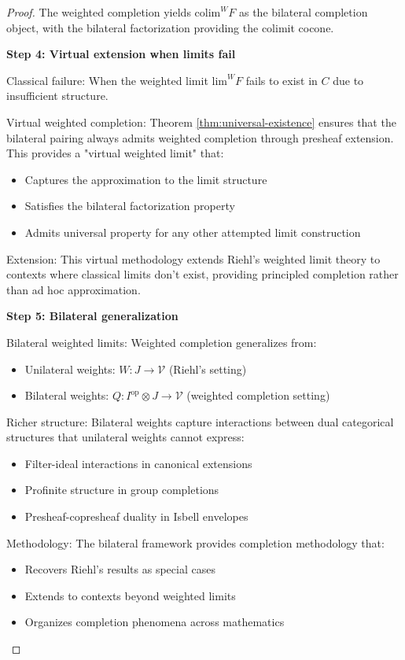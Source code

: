 \documentclass[11pt]{article}
\theoremstyle{plain}
\theoremstyle{definition}
\theoremstyle{remark}
\newcommand{\V}{\mathcal{V}}
\newcommand{\op}{\mathrm{op}}
\newcommand{\colim}{\mathrm{colim}}
\renewcommand{\lim}{\mathrm{lim}}
\begin{document}
\begin{proof}
The weighted completion yields $\colim^W F$ as the bilateral completion object, with the bilateral factorization providing the colimit cocone.

\textbf{Step 4: Virtual extension when limits fail}

Classical failure: When the weighted limit $\lim^W F$ fails to exist in $C$ due to insufficient structure.

Virtual weighted completion: Theorem \ref{thm:universal-existence} ensures that the bilateral pairing always admits weighted completion through presheaf extension. This provides a "virtual weighted limit" that:
\begin{itemize}
\item Captures the approximation to the limit structure
\item Satisfies the bilateral factorization property
\item Admits universal property for any other attempted limit construction
\end{itemize}

Extension: This virtual methodology extends Riehl's weighted limit theory to contexts where classical limits don't exist, providing principled completion rather than ad hoc approximation.

\textbf{Step 5: Bilateral generalization}

Bilateral weighted limits: Weighted completion generalizes from:
\begin{itemize}
\item Unilateral weights: $W : J \to \V$ (Riehl's setting)
\item Bilateral weights: $Q : I^{\op} \otimes J \to \V$ (weighted completion setting)
\end{itemize}

Richer structure: Bilateral weights capture interactions between dual categorical structures that unilateral weights cannot express:
\begin{itemize}
\item Filter-ideal interactions in canonical extensions
\item Profinite structure in group completions  
\item Presheaf-copresheaf duality in Isbell envelopes
\end{itemize}

Methodology: The bilateral framework provides completion methodology that:
\begin{itemize}
\item Recovers Riehl's results as special cases
\item Extends to contexts beyond weighted limits
\item Organizes completion phenomena across mathematics
\end{itemize}


\end{proof}
\end{document}
